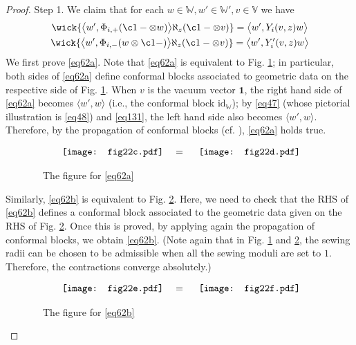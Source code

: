 \documentclass[11pt,b5paper,notitlepage]{article}
\theoremstyle{definition}
\theoremstyle{plain}
\newcommand{\idt}{\mathbf{1}}
\newcommand{\Vbb}{\mathbb V}
\newcommand{\Wbb}{\mathbb W}
\newcommand{\<}{\left\langle}
\renewcommand{\>}{\right\rangle}
\newcommand{\bk}[1]{\langle {#1}\rangle}
\newcommand{\id}{\mathrm{id}}
\newcommand{\Lan}{{\big\langle}}
\newcommand{\Ran}{{\big\rangle}}
\numberwithin{equation}{section}
\begin{document}
\begin{proof}
Step 1.	We claim that for each $w\in \Wbb,w'\in \Wbb',v\in \Vbb$ we have
\begin{subequations}\label{eq62}
\begin{gather}
\wick{\Lan w',\Phi_{i,+}(\c1 -\otimes w)\Ran \aleph_z(\c1 - \otimes v)}=\Lan w',Y_i(v,z)w \Ran\label{eq62a}\\
\wick{\Lan w',\Phi_{i,-}(w\otimes \c1 -)\Ran \aleph_z(\c1 - \otimes v)}=\Lan w',Y'_i(v,z)w \Ran\label{eq62b}
\end{gather}
\end{subequations}
We first prove \eqref{eq62a}. Note that \eqref{eq62a} is equivalent to Fig. \ref{img6}; in particular, both sides of \eqref{eq62a} define conformal blocks associated to geometric data on the respective side of Fig. \ref{img6}. When $v$ is the vacuum vector $\idt$, the right hand side of \eqref{eq62a} becomes $\bk{w',w}$ (i.e., the conformal block $\id_\Wbb$); by \eqref{eq47} (whose pictorial illustration is \eqref{eq48}) and \eqref{eq131}, the left hand side also becomes $\bk{w',w}$. Therefore, by the propagation of conformal blocks (cf. \cite[Cor. 2.44]{GZ1}), \eqref{eq62a} holds true.
\begin{figure}[h]
	\centering
\begin{align*}
		\vcenter{\hbox{{
			\texttt{[image: fig22c.pdf]}}}}\quad=\quad\vcenter{\hbox{{
				\texttt{[image: fig22d.pdf]}}}}
	 \end{align*}
\caption{~~The figure for \eqref{eq62a}}
	\label{img6}
\end{figure}

Similarly, \eqref{eq62b} is equivalent to Fig. \ref{img7}. Here, we need to check that the RHS of \eqref{eq62b} defines a conformal block associated to the geometric data given on the RHS of Fig. \ref{img7}. Once this is proved, by applying again the propagation of conformal blocks, we obtain \eqref{eq62b}. (Note again that in Fig. \ref{img6} and \ref{img7}, the sewing radii can be chosen to be admissible when all the sewing moduli are set to $1$. Therefore, the contractions converge absolutely.)
\begin{figure}[h]
	\centering
\begin{align*}
		\vcenter{\hbox{{
			\texttt{[image: fig22e.pdf]}}}}\quad=\quad\vcenter{\hbox{{
				\texttt{[image: fig22f.pdf]}}}}
	 \end{align*}
\caption{~~The figure for \eqref{eq62b}}
	\label{img7}
\end{figure}


\end{proof}
\end{document}
